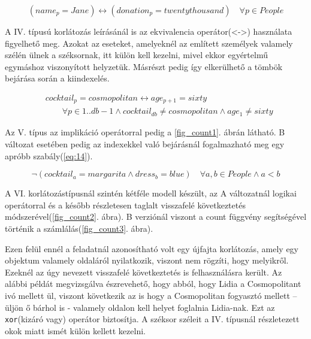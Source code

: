 \documentclass[12pt,a4paper,twoside, openright]{report}
\begin{document}
    \begin{equation} \label{eq:11}
    (name_p=Jane) \leftrightarrow (donation_p=twentythousand) \quad \forall p \in People
    \end{equation}

    A IV. típusú korlátozás leírásánál is az ekvivalencia operátor(<->) használata figyelhető meg.
    Azokat az eseteket, amelyeknél az említett személyek valamely szélén ülnek a széksornak, itt külön kell kezelni, mivel ekkor egyértelmű egymáshoz viszonyított helyzetük.
    Másrészt pedig így elkerülhető a tömbök bejárása során a 
    kiindexelés.

	\begin{equation} \label{eq:12}
	\begin{aligned}
	&cocktail_p=cosmopolitan \leftrightarrow age_{p+1}=sixty \\
	&\quad\quad\forall p \in 1..db-1 \wedge cocktail_{db} \neq cosmopolitan \wedge age_1 \neq sixty
	\end{aligned} 
	\end{equation}

    Az V. típus az implikáció operátorral pedig a \ref{fig_count1}. ábrán látható.
    B változat esetében pedig az indexekkel való bejárásnál fogalmazható meg egy apróbb szabály(\ref{eq:14}).
	
	
   \begin{equation} \label{eq:14}
    \neg(cocktail_a =margarita \wedge dress_b=blue) \quad \forall a,b \in People \wedge a<b
     \end{equation}

    A VI. korlátozástípusnál szintén kétféle modell készült, az A változatnál logikai 
    operátorral és a később részletesen taglalt visszafelé következtetés módszerével(\ref{fig_count2}. ábra).
    B 
    verziónál viszont a count függvény segítségével történik a számlálás(\ref{fig_count3}. ábra).

    
    

    Ezen felül ennél a feladatnál azonosítható volt egy újfajta korlátozás, amely egy objektum valamely oldaláról nyilatkozik, viszont nem rögzíti, hogy melyikről.
    Ezeknél az úgy nevezett visszafelé következtetés is felhasználásra került.
    Az alábbi példát megvizsgálva észrevehető, hogy abból, hogy Lidia a Cosmopolitant ivó mellett ül, viszont következik az is hogy a Cosmopolitan fogyasztó mellett – üljön ő bárhol is - valamely oldalon kell helyet foglalnia Lidia-nak.
    Ezt az \texttt{xor}(kizáró vagy) operátor biztosítja.
    A széksor széleit a IV. típusnál részletezett okok miatt ismét külön kellett kezelni.
\end{document}
